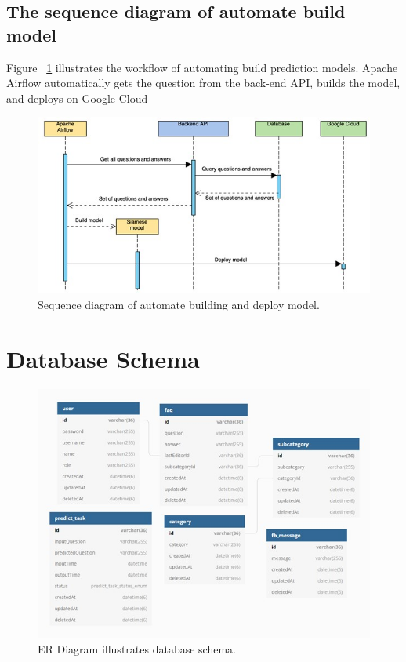 \documentclass[12pt,oneside,openright,a4paper]{cpe-english-project}
\begin{document}
\pagebreak

\subsection{The sequence diagram of automate build model}
Figure ~\ref*{fig:Sequence diagram of automate building and deploy model.} illustrates the workflow of automating build prediction models. Apache Airflow automatically gets the question from the back-end API, builds the model, and deploys on Google Cloud
\begin{figure}[!h]
	\includegraphics[width=14cm]{img/ch3/sequence diagram of automate build model.jpg}
	\caption{Sequence diagram of automate building and deploy model.}\label{fig:Sequence diagram of automate building and deploy model.}
\end{figure}

\section{Database Schema}
\begin{figure}[!h]
	\includegraphics[width=14cm]{img/ch3/Database Schema.jpg}
	\caption{ER Diagram illustrates database schema.}\label{fig:ER Diagram illustrates database schema.}
\end{figure}
\end{document}
